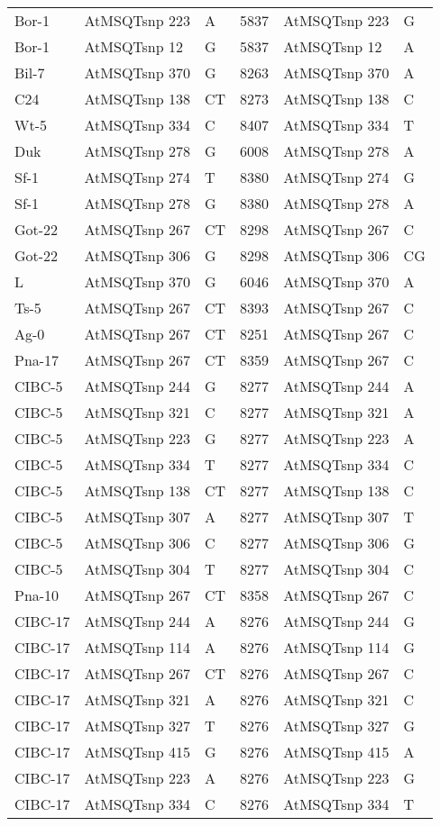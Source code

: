 \begin{center}
\begin{longtable}{|l|l|l|l|l|l|}
Bor-1&AtMSQTsnp 223&A&5837&AtMSQTsnp 223&G\\
Bor-1&AtMSQTsnp 12&G&5837&AtMSQTsnp 12&A\\
Bil-7&AtMSQTsnp 370&G&8263&AtMSQTsnp 370&A\\
C24&AtMSQTsnp 138&CT&8273&AtMSQTsnp 138&C\\
Wt-5&AtMSQTsnp 334&C&8407&AtMSQTsnp 334&T\\
Duk&AtMSQTsnp 278&G&6008&AtMSQTsnp 278&A\\
Sf-1&AtMSQTsnp 274&T&8380&AtMSQTsnp 274&G\\
Sf-1&AtMSQTsnp 278&G&8380&AtMSQTsnp 278&A\\
Got-22&AtMSQTsnp 267&CT&8298&AtMSQTsnp 267&C\\
Got-22&AtMSQTsnp 306&G&8298&AtMSQTsnp 306&CG\\
L&AtMSQTsnp 370&G&6046&AtMSQTsnp 370&A\\
Ts-5&AtMSQTsnp 267&CT&8393&AtMSQTsnp 267&C\\
Ag-0&AtMSQTsnp 267&CT&8251&AtMSQTsnp 267&C\\
Pna-17&AtMSQTsnp 267&CT&8359&AtMSQTsnp 267&C\\
CIBC-5&AtMSQTsnp 244&G&8277&AtMSQTsnp 244&A\\
CIBC-5&AtMSQTsnp 321&C&8277&AtMSQTsnp 321&A\\
CIBC-5&AtMSQTsnp 223&G&8277&AtMSQTsnp 223&A\\
CIBC-5&AtMSQTsnp 334&T&8277&AtMSQTsnp 334&C\\
CIBC-5&AtMSQTsnp 138&CT&8277&AtMSQTsnp 138&C\\
CIBC-5&AtMSQTsnp 307&A&8277&AtMSQTsnp 307&T\\
CIBC-5&AtMSQTsnp 306&C&8277&AtMSQTsnp 306&G\\
CIBC-5&AtMSQTsnp 304&T&8277&AtMSQTsnp 304&C\\
Pna-10&AtMSQTsnp 267&CT&8358&AtMSQTsnp 267&C\\
CIBC-17&AtMSQTsnp 244&A&8276&AtMSQTsnp 244&G\\
CIBC-17&AtMSQTsnp 114&A&8276&AtMSQTsnp 114&G\\
CIBC-17&AtMSQTsnp 267&CT&8276&AtMSQTsnp 267&C\\
CIBC-17&AtMSQTsnp 321&A&8276&AtMSQTsnp 321&C\\
CIBC-17&AtMSQTsnp 327&T&8276&AtMSQTsnp 327&G\\
CIBC-17&AtMSQTsnp 415&G&8276&AtMSQTsnp 415&A\\
CIBC-17&AtMSQTsnp 223&A&8276&AtMSQTsnp 223&G\\
CIBC-17&AtMSQTsnp 334&C&8276&AtMSQTsnp 334&T\\

\end{longtable}
\end{center}
